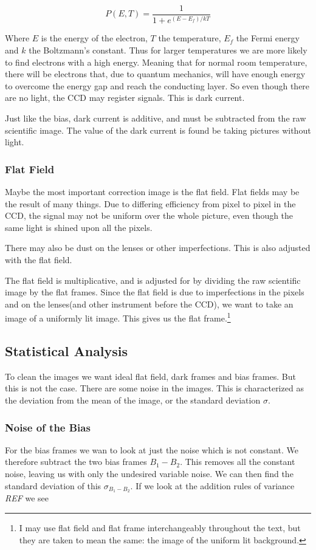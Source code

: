 \documentclass{emulateapj}
\begin{document}
\begin{equation}
P(E,T) = \frac{1}{1 + e^{(E-E_f)/kT}}
\end{equation}

Where $E$ is the energy of the electron, $T$ the temperature, $E_f$ the Fermi energy and $k$ the Boltzmann's constant. Thus for larger temperatures we are more likely to find electrons with a high energy. Meaning that for normal room temperature, there will be electrons that, due to quantum mechanics, will have enough energy to overcome the energy gap and reach the conducting layer. So even though there are no light, the CCD may register signals. This is dark current.

Just like the bias, dark current is additive, and must be subtracted from the raw scientific image. The value of the dark current is found be taking pictures without light.

\subsubsection{Flat Field}
Maybe the most important correction image is the flat field. Flat fields may be the result of many things. Due to differing efficiency from pixel to pixel in the CCD, the signal may not be uniform over the whole picture, even though the same light is shined upon all the pixels. 

There may also be dust on the lenses or other imperfections. This is also adjusted with the flat field.

The flat field is multiplicative, and is adjusted for by dividing the raw scientific image by the flat frames. Since the flat field is due to imperfections in the pixels and on the lenses(and other instrument before the CCD), we want to take an image of a uniformly lit image. This gives us the flat frame.\footnote{I may use flat field and flat frame interchangeably throughout the text, but they are taken to mean the same: the image of the uniform lit background.}

\subsection{Statistical Analysis}
To clean the images we want ideal flat field, dark frames and bias frames. But this is not the case. There are some noise in the images. This is characterized as the deviation from the mean of the image, or the standard deviation $\sigma$.

\subsubsection{Noise of the Bias}
\label{sec:noiseBias}
For the bias frames we wan to look at just the noise which is not constant. We therefore subtract the two bias frames $B_1 - B_2$. This removes all the constant noise, leaving us with only the undesired variable noise. We can then find the standard deviation of this $\sigma_{B_1 - B_2}$. If we look at the addition rules of variance \emph{REF} we see
\end{document}
